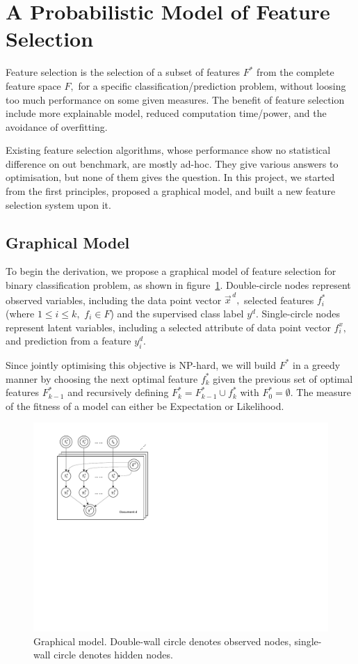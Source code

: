 \section{A Probabilistic Model of Feature Selection}

Feature selection is the selection of a subset of features $F^*$ from the complete feature space $F,$ for a specific classification/prediction problem, without loosing too much performance on some given measures. The benefit of feature selection include more explainable model, reduced computation time/power, and the avoidance of overfitting.

Existing feature selection algorithms, whose performance show no statistical difference on out benchmark, are mostly ad-hoc. They give various answers to optimisation, but none of them gives the question. In this project, we started from the first principles, proposed a graphical model, and built a new feature selection system upon it.

\subsection{Graphical Model}

To begin the derivation, we propose a graphical model of feature selection for binary classification problem, as shown in figure~\ref{fig:model}. Double-circle nodes represent observed variables, including the data point vector $\vec{x}^{\,d},$ selected features $f_i^*$ (where $1\leq i\leq k,$ $f_i\in F$) and the supervised class label $y^d.$ Single-circle nodes represent latent variables, including a selected attribute of data point vector $f_i^x,$ and prediction from a feature $y^d_i.$ 

Since jointly optimising this objective is NP-hard, we will build $F^*$ in a greedy manner by choosing the next optimal feature $f^*_k$ given the previous set of optimal features $F^*_{k-1}$ and recursively defining $F^*_k = F^*_{k-1}\cup f^*_k$ with $F^*_0 = \emptyset$. The measure of the fitness of a model can either be Expectation or Likelihood.

\begin{figure}[tbp!]
	\centering
	\includegraphics[scale=0.9]{Plots_1.pdf}
	\caption{Graphical model. Double-wall circle denotes observed nodes, single-wall circle denotes hidden nodes.}
	\label{fig:model}
\end{figure}

